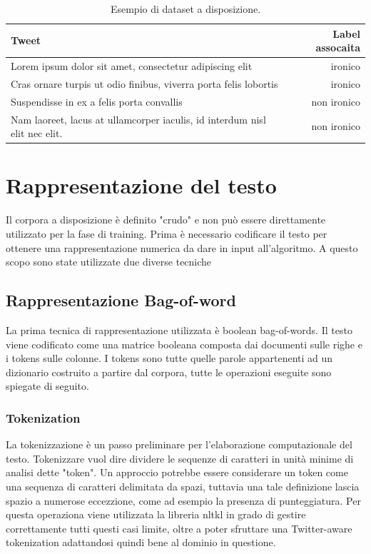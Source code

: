 \documentclass[oneside]{book}
\begin{document}
\begin{table}[h!]
	\centering
	\begin{tabular}[t]{lr}
		\hline
		\textbf{Tweet} & \textbf{Label assocaita}\\
		\hline
		Lorem ipsum dolor sit amet, consectetur adipiscing elit & ironico     \\
		Cras ornare turpis ut odio finibus, viverra porta felis lobortis & ironico \\
		Suspendisse in ex a felis porta convallis & non ironico \\
		Nam laoreet, lacus at ullamcorper iaculis, id interdum nisl elit nec elit. & non ironico \\
		
		\hline
	\end{tabular}
	\caption{Esempio di dataset a disposizione.}
\end{table}%




\section{Rappresentazione del testo}
Il corpora a disposizione è definito "crudo" e non può essere direttamente utilizzato per la fase di training. Prima è necessario codificare il testo per ottenere una rappresentazione numerica da dare in input all'algoritmo. A questo scopo sono state utilizzate due diverse tecniche

\subsection{Rappresentazione Bag-of-word}
La prima tecnica di rappresentazione utilizzata è boolean bag-of-words.
Il testo viene codificato come una matrice booleana composta dai documenti sulle righe e i tokens sulle colonne. I tokens sono tutte quelle parole appartenenti ad un dizionario costruito a partire dal corpora, tutte le operazioni eseguite sono spiegate di seguito.

\subsubsection{Tokenization}
La tokenizzazione è un passo preliminare per l'elaborazione computazionale del testo. Tokenizzare vuol dire dividere le sequenze di caratteri in unità minime di analisi dette "token". Un approccio potrebbe essere considerare un token come una sequenza di caratteri delimitata da spazi, tuttavia una tale definizione lascia spazio a numerose eccezzione, come ad esempio la presenza di punteggiatura. Per questa operaziona viene utilizzata la libreria
nltkl \cite{nltk} in grado di gestire correttamente tutti questi casi limite, oltre a poter sfruttare una Twitter-aware tokenization adattandosi quindi bene al dominio in questione.
\end{document}
